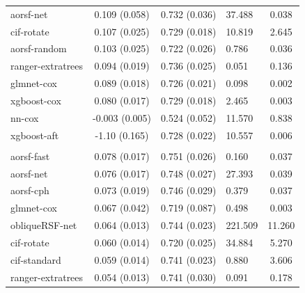 \documentclass[twoside,11pt]{article}\usepackage[]{graphicx}\usepackage[]{xcolor}
\newenvironment{knitrout}{}{} %
\begin{document}
\begin{knitrout}
\begin{longtable}[t]{lcclc}
\hspace{1em}aorsf-net & 0.109 (0.058) & 0.732 (0.036) & 37.488 & 0.038\\
\hspace{1em}cif-rotate & 0.107 (0.025) & 0.729 (0.018) & 10.819 & 2.645\\
\hspace{1em}aorsf-random & 0.103 (0.025) & 0.722 (0.026) & 0.786 & 0.036\\
\hspace{1em}ranger-extratrees & 0.094 (0.019) & 0.736 (0.025) & 0.051 & 0.136\\
\hspace{1em}glmnet-cox & 0.089 (0.018) & 0.726 (0.021) & 0.098 & 0.002\\
\hspace{1em}xgboost-cox & 0.080 (0.017) & 0.729 (0.018) & 2.465 & 0.003\\
\hspace{1em}nn-cox & -0.003 (0.005) & 0.524 (0.052) & 11.570 & 0.838\\
\hspace{1em}xgboost-aft & -1.10 (0.165) & 0.728 (0.022) & 10.557 & 0.006\\
\addlinespace[0.3em]
\hline
\multicolumn{5}{l}{\textit{\textbf{GUIDE-IT; CVD death, n = 894, p = 59}}}\\
\hline
\hspace{1em}aorsf-fast & 0.078 (0.017) & 0.751 (0.026) & 0.160 & 0.037\\
\hspace{1em}aorsf-net & 0.076 (0.017) & 0.748 (0.027) & 27.393 & 0.039\\
\hspace{1em}aorsf-cph & 0.073 (0.019) & 0.746 (0.029) & 0.379 & 0.037\\
\hspace{1em}glmnet-cox & 0.067 (0.042) & 0.719 (0.087) & 0.498 & 0.003\\
\hspace{1em}obliqueRSF-net & 0.064 (0.013) & 0.744 (0.023) & 221.509 & 11.260\\
\hspace{1em}cif-rotate & 0.060 (0.014) & 0.720 (0.025) & 34.884 & 5.270\\
\hspace{1em}cif-standard & 0.059 (0.014) & 0.741 (0.023) & 0.880 & 3.606\\
\hspace{1em}ranger-extratrees & 0.054 (0.013) & 0.741 (0.030) & 0.091 & 0.178\\

\end{longtable}
\end{knitrout}
\end{document}
